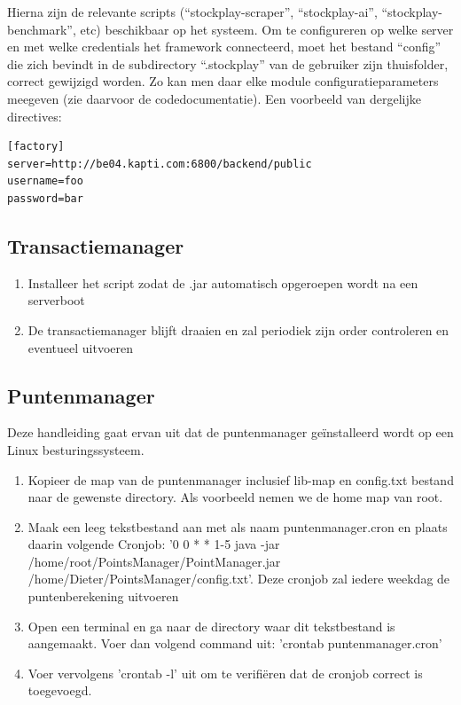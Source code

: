 Hierna zijn de relevante scripts (``stockplay-scraper'', ``stockplay-ai'', ``stockplay-benchmark'', etc) beschikbaar op het systeem. Om te configureren op welke server en met welke credentials het framework connecteerd, moet het bestand ``config'' die zich bevindt in de subdirectory ``.stockplay'' van de gebruiker zijn thuisfolder, correct gewijzigd worden. Zo kan men daar elke module configuratieparameters meegeven (zie daarvoor de codedocumentatie). Een voorbeeld van dergelijke directives:
\begin{verbatim}
[factory]
server=http://be04.kapti.com:6800/backend/public
username=foo
password=bar
\end{verbatim}


\subsection{Transactiemanager}

\begin{enumerate}
\item{Installeer het script zodat de .jar automatisch opgeroepen wordt na een serverboot}
\item{De transactiemanager blijft draaien en zal periodiek zijn order controleren en eventueel uitvoeren}
\end{enumerate}

\subsection{Puntenmanager}
Deze handleiding gaat ervan uit dat de puntenmanager ge\"installeerd wordt op een Linux besturingssysteem.
\begin{enumerate}
\item{Kopieer de map van de puntenmanager inclusief lib-map en config.txt bestand naar de gewenste directory. Als voorbeeld nemen we de home map van root.}
\item{Maak een leeg tekstbestand aan met als naam puntenmanager.cron en plaats daarin volgende Cronjob: '0 0 * * 1-5 java -jar /home/root/PointsManager/PointManager.jar /home/Dieter/PointsManager/config.txt'. Deze cronjob zal iedere weekdag de puntenberekening uitvoeren}
\item{Open een terminal en ga naar de directory waar dit tekstbestand is aangemaakt.  Voer dan volgend command uit: 'crontab puntenmanager.cron'}
\item{Voer vervolgens 'crontab -l' uit om te verifi\"eren dat de cronjob correct is toegevoegd.}
\end{enumerate}

